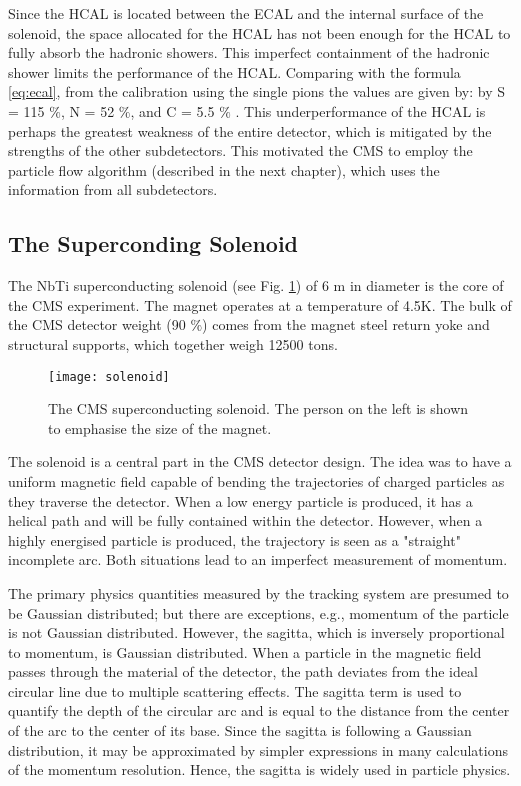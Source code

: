 \begin{normalsize}
Since the HCAL is located between the ECAL and the internal surface of the solenoid, the space allocated for the HCAL has not been enough for the HCAL to fully absorb the hadronic showers. This imperfect containment of the hadronic shower limits the performance of the HCAL. Comparing with the formula \ref{eq:ecal}, from the calibration using the single pions the values are given by:  by S = 115 $\%$, N = 52  $\%$, and C = 5.5 $\%$ \cite{Baiatian_hcal}. This underperformance of the HCAL is perhaps the greatest weakness of the entire detector, which is mitigated by the strengths of the other subdetectors. This motivated the CMS to employ the particle flow algorithm (described in the next chapter), which uses the information from all subdetectors.





\subsection{The Superconding Solenoid}


The NbTi superconducting solenoid (see Fig. \ref{solenoid}) of 6 m in diameter is the core of the CMS experiment. The magnet operates at a temperature of 4.5K. The bulk of the CMS detector weight (90 $\%$) comes from the magnet steel return yoke and structural supports, which together weigh 12500 tons.
 
 \begin{figure}[H]
  \centering
  \texttt{[image: solenoid]}
  \caption[The CMS superconducting solenoid]{The CMS superconducting solenoid. The person on the left is shown to emphasise the size of the magnet.}
  \label{solenoid}
\end{figure}

The solenoid is a central part in the CMS detector design. The idea was to have a uniform magnetic field capable of bending the trajectories of charged particles as they traverse the detector. When a low energy particle is produced, it has a helical path and will be fully contained within the detector. However, when a highly energised particle is produced, the trajectory is seen as a "straight" incomplete arc. Both situations lead to an imperfect measurement of momentum. 

The primary physics quantities measured by the tracking system are presumed to be Gaussian distributed; but there are exceptions, e.g., momentum of the particle is not Gaussian distributed. However, the sagitta, which is inversely proportional to momentum, is Gaussian distributed. When a particle in the magnetic field passes through the material of the detector, the path deviates from the ideal circular line due to multiple scattering effects. The sagitta term is used to quantify the depth of the circular arc and is equal to the distance from the center of the arc to the center of its base. Since the sagitta is following a Gaussian distribution, it may be approximated by simpler expressions in many calculations of the momentum resolution. Hence, the sagitta is widely used in particle physics. 


\end{normalsize}
